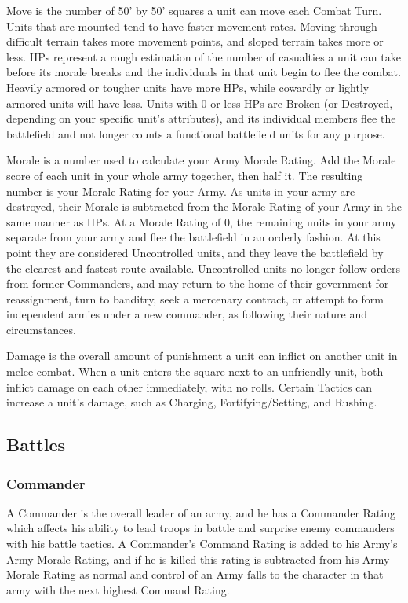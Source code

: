 Move is the number of 50' by 50' squares a unit can move each Combat Turn. Units that are mounted tend to have faster movement rates. Moving through difficult terrain takes more movement points, and sloped terrain takes more or less.
HPs represent a rough estimation of the number of casualties a unit can take before its morale breaks and the individuals in that unit begin to flee the combat. Heavily armored or tougher units have more HPs, while cowardly or lightly armored units will have less. Units with 0 or less HPs are Broken (or Destroyed, depending on your specific unit's attributes), and its individual members flee the battlefield and not longer counts a functional battlefield units for any purpose.

Morale is a number used to calculate your Army Morale Rating. Add the Morale score of each unit in your whole army together, then half it. The resulting number is your Morale Rating for your Army. As units in your army are destroyed, their Morale is subtracted from the Morale Rating of your Army in the same manner as HPs. At a Morale Rating of 0, the remaining units in your army separate from your army and flee the battlefield in an orderly fashion. At this point they are considered Uncontrolled units, and they leave the battlefield by the clearest and fastest route available. Uncontrolled units no longer follow orders from former Commanders, and may return to the home of their government for reassignment, turn to banditry, seek a mercenary contract, or attempt to form independent armies under a new commander, as following their nature and circumstances.

Damage is the overall amount of punishment a unit can inflict on another unit in melee combat. When a unit enters the square next to an unfriendly unit, both inflict damage on each other immediately, with no rolls. Certain Tactics can increase a unit's damage, such as Charging, Fortifying/Setting, and Rushing.

\subsection{Battles}

\subsubsection{Commander} A Commander is the overall leader of an army, and he has a Commander Rating which affects his ability to lead troops in battle and surprise enemy commanders with his battle tactics. A Commander's Command Rating is added to his Army's Army Morale Rating, and if he is killed this rating is subtracted from his Army Morale Rating as normal and control of an Army falls to the character in that army with the next highest Command Rating.

